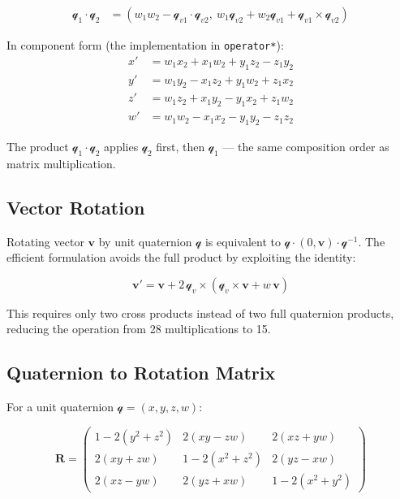 \documentclass[12pt, a4paper]{report}
\theoremstyle{definition}
\theoremstyle{remark}
\begin{document}
\begin{align}
\mathcal{q}_1 \cdot \mathcal{q}_2 &=
(w_1 w_2 - \mathcal{q}_{v1} \cdot \mathcal{q}_{v2},\
 w_1 \mathcal{q}_{v2} + w_2 \mathcal{q}_{v1} + \mathcal{q}_{v1} \times \mathcal{q}_{v2})
\end{align}

In component form (the implementation in \texttt{operator*}):
\begin{align}
x' &= w_1 x_2 + x_1 w_2 + y_1 z_2 - z_1 y_2 \\
y' &= w_1 y_2 - x_1 z_2 + y_1 w_2 + z_1 x_2 \\
z' &= w_1 z_2 + x_1 y_2 - y_1 x_2 + z_1 w_2 \\
w' &= w_1 w_2 - x_1 x_2 - y_1 y_2 - z_1 z_2
\end{align}

The product $\mathcal{q}_1 \cdot \mathcal{q}_2$ applies $\mathcal{q}_2$ first,
then $\mathcal{q}_1$ — the same composition order as matrix multiplication.

\subsection{Vector Rotation}

Rotating vector $\mathbf{v}$ by unit quaternion $\mathcal{q}$ is equivalent to
$\mathcal{q} \cdot (0, \mathbf{v}) \cdot \mathcal{q}^{-1}$.
The efficient formulation avoids the full product by exploiting the identity:

\begin{equation}
\mathbf{v}' = \mathbf{v} + 2\,\mathcal{q}_v \times (\mathcal{q}_v \times \mathbf{v} + w\,\mathbf{v})
\label{eq:quat-rotate}
\end{equation}

This requires only two cross products instead of two full quaternion products,
reducing the operation from 28 multiplications to 15.

\subsection{Quaternion to Rotation Matrix}

For a unit quaternion $\mathcal{q} = (x, y, z, w)$:

\[
\mathbf{R} =
\begin{pmatrix}
1 - 2(y^2+z^2) & 2(xy - zw)     & 2(xz + yw) \\
2(xy + zw)     & 1 - 2(x^2+z^2) & 2(yz - xw) \\
2(xz - yw)     & 2(yz + xw)     & 1 - 2(x^2+y^2)
\end{pmatrix}
\]
\end{document}
